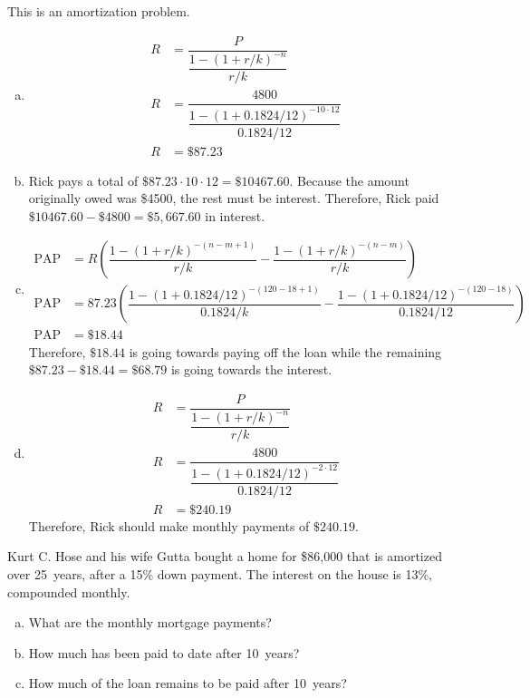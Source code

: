 \documentclass[11pt,letterpaper]{article}
\begin{document}
\sol This is an amortization problem.
\begin{enumerate}[(a)]
\item 
	\[
	\begin{aligned}
	R&= \dfrac{P}{\dfrac{1 - (1 + r/k)^{-n}}{r/k}} \\
	R&= \dfrac{4800}{\dfrac{1 - (1 + 0.1824/12)^{-10 \cdot 12}}{0.1824/12}} \\
	R&= \$87.23
	\end{aligned}
	\]
\item Rick pays a total of $\$87.23 \cdot 10 \cdot 12= \$10467.60$. Because the amount originally owed was \$4500, the rest must be interest. Therefore, Rick paid $\$10467.60 - \$4800= \$5,667.60$ in interest. 

\item 
	\[
	\begin{aligned}
	\text{PAP}&= R \left( \dfrac{1 - (1 + r/k)^{-(n - m + 1)}}{r/k} - \dfrac{1 - (1 + r/k)^{-(n - m)}}{r/k} \right) \\
	\text{PAP}&= 87.23 \left( \dfrac{1 - (1 + 0.1824/12)^{-(120 - 18 + 1)}}{0.1824/k} - \dfrac{1 - (1 + 0.1824/12)^{-(120 - 18)}}{0.1824/12} \right) \\
	\text{PAP}&= \$18.44
	\end{aligned}
	\]
Therefore, $\$18.44$ is going towards paying off the loan while the remaining $\$87.23 - \$18.44= \$68.79$ is going towards the interest. 

\item 
	\[
	\begin{aligned}
	R&= \dfrac{P}{\dfrac{1 - (1 + r/k)^{-n}}{r/k}} \\
	R&= \dfrac{4800}{\dfrac{1 - (1 + 0.1824/12)^{-2 \cdot 12}}{0.1824/12}} \\
	R&= \$240.19
	\end{aligned}
	\]
Therefore, Rick should make monthly payments of $\$240.19$. 
\end{enumerate}





\newpage





 Kurt C. Hose and his wife Gutta bought a home for \$86,000 that is amortized over 25~years, after a 15\% down payment. The interest on the house is 13\%, compounded monthly. 
\begin{enumerate}[(a)]
\item What are the monthly mortgage payments?
\item How much has been paid to date after 10~years?
\item How much of the loan remains to be paid after 10~years?
\end{enumerate} \pspace
\end{document}
